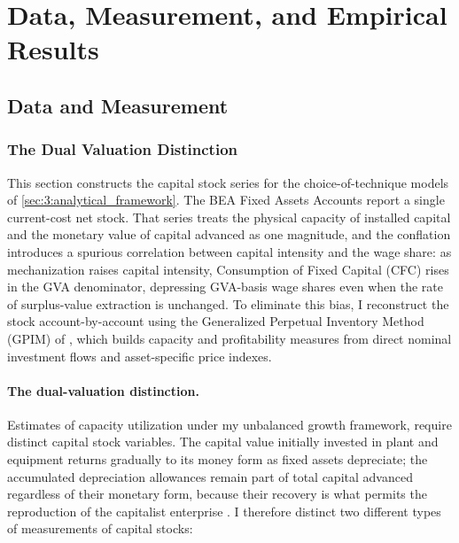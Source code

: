 \section{Data, Measurement, and Empirical Results}
\subsection{Data and Measurement}
\label{sec:41:data_measurement}

\subsubsection{The Dual Valuation Distinction}
\label{sec:411:dual_valuation}

This section constructs the capital stock series for the
choice-of-technique models of \cref{sec:3:analytical_framework}.
The BEA Fixed Assets Accounts report a single current-cost net stock.
That series treats the physical capacity of installed capital and
the monetary value of capital advanced as one magnitude, and the
conflation introduces a spurious correlation between capital
intensity and the wage share: as mechanization raises capital
intensity, Consumption of Fixed Capital (CFC) rises in the GVA
denominator, depressing GVA-basis wage shares even when the rate of
surplus-value extraction is unchanged. To eliminate this bias, I
reconstruct the stock account-by-account using the Generalized
Perpetual Inventory Method (GPIM) of \citet[App.~6.5]{Shaikh2016},
which builds capacity and profitability measures from direct nominal
investment flows and asset-specific price indexes.

\paragraph{The dual-valuation distinction.}
Estimates of capacity utilization under my unbalanced growth framework, require distinct 
capital stock variables. The capital value initially invested in plant and equipment returns
gradually to its money form as fixed assets depreciate; the
accumulated depreciation allowances remain part of total capital
advanced regardless of their monetary form, because their recovery
is what permits the reproduction of the capitalist enterprise 
\citep[App.~6.3]{Shaikh2016}. I therefore distinct two different types of
measurements of capital stocks:

